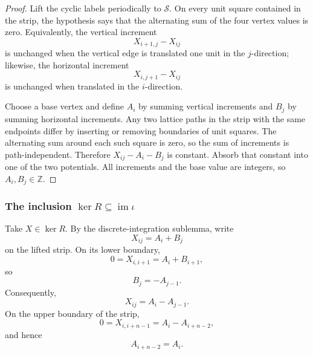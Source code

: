 \documentclass[11pt]{article}
\theoremstyle{definition}
\newcommand{\Z}{\mathbb Z}
\newcommand{\im}{\operatorname{im}}
\begin{document}
\begin{proof}
Lift the cyclic labels periodically to $\mathcal S$.  On every unit square
contained in the strip, the hypothesis says that the alternating sum of the
four vertex values is zero.  Equivalently, the vertical increment
\[
 X_{i+1,j}-X_{ij}
\]
is unchanged when the vertical edge is translated one unit in the
$j$-direction; likewise, the horizontal increment
\[
 X_{i,j+1}-X_{ij}
\]
is unchanged when translated in the $i$-direction.

Choose a base vertex and define $A_i$ by summing vertical increments and
$B_j$ by summing horizontal increments.  Any two lattice paths in the strip
with the same endpoints differ by inserting or removing boundaries of unit
squares.  The alternating sum around each such square is zero, so the sum of
increments is path-independent.  Therefore $X_{ij}-A_i-B_j$ is constant.
Absorb that constant into one of the two potentials.  All increments and the
base value are integers, so $A_i,B_j\in\Z$.
\end{proof}

\subsubsection{The inclusion \texorpdfstring{$\ker R\subseteq\im\iota$}{ker(R) contained in im(iota)}}

Take $X\in\ker R$.  By the discrete-integration sublemma, write
\[
 X_{ij}=A_i+B_j
\]
on the lifted strip.  On its lower boundary,
\[
 0=X_{i,i+1}=A_i+B_{i+1},
\]
so
\begin{equation}\label{eq:B-from-A}
 B_j=-A_{j-1}.
\end{equation}
Consequently,
\begin{equation}\label{eq:X-A}
 X_{ij}=A_i-A_{j-1}.
\end{equation}
On the upper boundary of the strip,
\[
0=X_{i,i+n-1}=A_i-A_{i+n-2},
\]
and hence
\begin{equation}\label{eq:A-period-n-2}
 A_{i+n-2}=A_i.
\end{equation}
\end{document}
